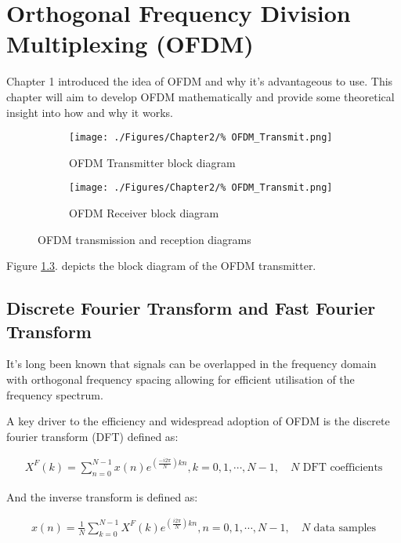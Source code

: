 \chapter{Orthogonal Frequency Division Multiplexing (OFDM)}

Chapter 1 introduced the idea of OFDM and why it's %
advantageous to use. This chapter will aim to develop %
OFDM mathematically and provide some theoretical insight %
into how and why it works.
\begin{figure}[h!]
	\begin{subfigure}{\linewidth}
		\texttt{[image: ./Figures/Chapter2/\%
		OFDM\_Transmit.png]}
		\caption{OFDM Transmitter block diagram}	
		\label{subfig:OFDM_Transmitter}
	\end{subfigure}
	\begin{subfigure}{\linewidth}
		\texttt{[image: ./Figures/Chapter2/\%
		OFDM\_Transmit.png]}
		\caption{OFDM Receiver block diagram}
		\label{subfig:OFDM_Receiver}
	\end{subfigure}
	\caption{OFDM transmission and reception diagrams}
	\label{fig:OFDM}
\end{figure}

Figure \ref{fig:OFDM}. %
depicts the block diagram of the OFDM transmitter.

\section{Discrete Fourier Transform and Fast Fourier Transform}

It's long been known that signals can be overlapped in the %
frequency domain with orthogonal frequency spacing %
allowing for efficient utilisation of the %
frequency spectrum\cite{Chang66}.

A key driver to the efficiency and widespread adoption %
of OFDM is the discrete fourier transform (DFT) defined %
as\cite{Rao2010}:

\begin{align}
	X^F(k) = \sum_{n=0}^{N-1}x(n)e^{(\frac{-i 2\pi}{N})kn}, %
	k=0,1,\cdots,N-1,\quad N \text{ DFT coefficients}
\end{align}

And the inverse transform is defined as:

\begin{align}
	x(n) = \frac{1}{N}\sum_{k=0}^{N-1}X^{F}(k)%
	e^{(\frac{i 2\pi}{N})kn}, n = 0,1,\cdots,N-1, \quad%
	N \text{ data samples}
	\label{eq:IDFT}
\end{align}

